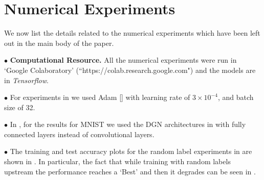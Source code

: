 \appendix

\section{Numerical Experiments}
We now list the details related to the numerical experiments which have been left out in the main body of the paper.

\indent \quad $\bullet$ \textbf{Computational Resource.} All the numerical experiments were run in `Google Colaboratory' (``https://colab.research.google.com") and the models are in \emph{Tensorflow}.



\indent \quad $\bullet$ For experiments in  we used Adam [] with learning rate of $3\times 10^{-4}$, and batch size of 32.


\indent \quad $\bullet$ In , for the results  for MNIST we used the DGN architectures in  with fully connected layers instead of convolutional layers. 

\indent \quad $\bullet$ The training and test accuracy plots for the random label experiments in  are shown in . In particular, the fact that while training with random labels upstream the performance reaches a `Best' and then it degrades can be seen in . 

